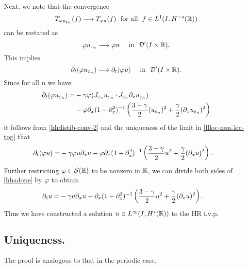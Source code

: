 %
Next, we note that the convergence  
%
\begin{equation}
\label{hhweak-conv-2}
T_{\varphi u_{\varepsilon_n}}(f)  \longrightarrow  T_{\varphi u} (f) \;
\ \text{for all} \  \;  f \in L^1(I, H^{-s}(\mathbb{R}))
\end{equation}
%
can be restated as 
%
\begin{equation}
\varphi u_{\varepsilon_n}  \longrightarrow  \varphi u
\quad
\ \text{in} \  \,\,
\mathcal{D}'(I\times \mathbb{R}).
\end{equation}
%
This implies 
%
\begin{equation}
\label{hhdistib-conv-2}
\partial_t(\varphi u_{\varepsilon_n})  \longrightarrow  \partial_t (\varphi u)
\quad
\ \text{in} \   \,\, \mathcal{D}'(I\times \mathbb{R}).
\end{equation}
%
Since for all $n$ we have 
%
\begin{equation}
\begin{split}
\partial_t (\varphi u_{\varepsilon_n})
= & -\gamma \varphi
(J_{\varepsilon_n} u_{\varepsilon_n}  \cdot
J_{\varepsilon_n}\partial_x u_{\varepsilon_n})
\\
& -
\varphi \partial_x(1- \partial_x^2)^{-1} \left( \frac{3-\gamma}{2} (u_{\varepsilon_n})^2
+ \frac{\gamma}{2} (\partial_x u_{\varepsilon_n})^2 \right )
\end{split}
\end{equation}
%
it follows from \eqref{hhdistib-conv-2} and the uniqueness of the
limit in \eqref{llloc-non-loc-tog} that
\begin{equation}
\begin{split}
\partial_t (\varphi u)
= & -\gamma \varphi
u \partial_x u - \varphi \partial_x(1- \partial_x^2)^{-1} \left( \frac{3-\gamma}{2} u^2
+ \frac{\gamma}{2} (\partial_x u)^2 \right ).
\label{hhadone}
\end{split}
\end{equation}
Further restricting $\varphi \in \mathcal{S}(\mathbb{R})$ to be nonzero in
$\mathbb{R}$, we
can divide both sides of \eqref{hhadone} by $\varphi$ to obtain
\begin{equation}
\label{hh2yy}
\begin{split}
\partial_t  u
= & -\gamma
u \partial_x u - \partial_x(1- \partial_x^2)^{-1} \left( \frac{3-\gamma}{2} u^2
+ \frac{\gamma}{2} (\partial_x u)^2 \right ).
\end{split}
\end{equation}
Thus we have constructed a solution $u \in L^\infty(I, H^s(\mathbb{R}))$
to the HR i.v.p. 
\subsection{Uniqueness.} The proof is analogous to that in the periodic case.
